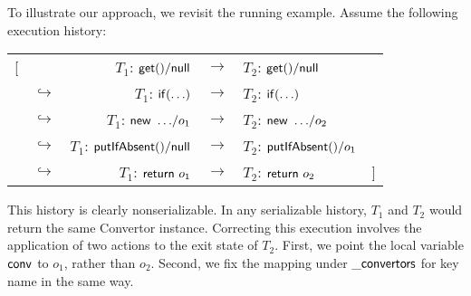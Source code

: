 To illustrate our approach, we revisit the running example. Assume the following execution history: %
	\begin{center}
		\footnotesize
		\begin{tabular}{rlrcll}
			[ & & $T_1$: ${\sf get()}/{\sf null}$ & $\rightarrow$ & $T_2$: ${\sf get()}/{\sf null}$  & \\
			& $\hookrightarrow$ & $T_1$: ${\sf if(\ldots)}$ & $\rightarrow$  & $T_2$: ${\sf if(\ldots)}$ & \\ 
			& $\hookrightarrow$ & $T_1$: ${\sf new\ \ldots}/o_1$ & $\rightarrow$ & $T_2$: ${\sf new\ \ldots}/o_2$ & \\ 
			& $\hookrightarrow$ & $T_1$: ${\sf putIfAbsent()}/{\sf null}$ & $\rightarrow$ & $T_2$: ${\sf putIfAbsent()}/o_1$  & \\ 
			& $\hookrightarrow$ & $T_1$: ${\sf return}\ o_1$ & $\rightarrow$ & $T_2$: ${\sf return}\ o_2$ & ]
		\end{tabular}
		\end{center}
This history is clearly nonserializable. In any serializable history, $T_1$ and $T_2$ would return the same {\sf Convertor} instance. Correcting this execution involves the application of two actions to the exit state of $T_2$. First, we point the local variable ${\sf conv}$ to $o_1$, rather than $o_2$. Second, we fix the mapping under ${\sf \_convertors}$ for key {\sf name} in the same way.

